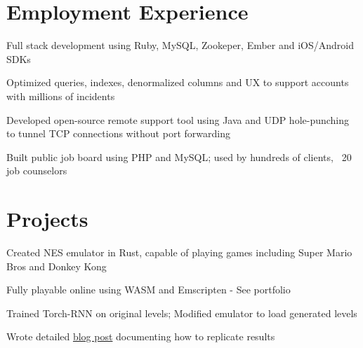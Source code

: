 \documentclass[]{deedy-resume-openfont}
\begin{document}
\begin{minipage}[t]{0.67\textwidth}

\section{Employment Experience}
\vspace{\topsep} %
\begin{tightemize}
	\item Full stack development using Ruby, MySQL, Zookeper, Ember and iOS/Android SDKs
	\item Optimized queries, indexes, denormalized columns and UX to support accounts with millions of incidents
\end{tightemize}
\sectionsep

\begin{tightemize}
	\item Developed open-source remote support tool using Java and UDP hole-punching to tunnel TCP connections without port forwarding
	\item Built public job board using PHP and MySQL; used by hundreds of clients, ~20 job counselors
\end{tightemize}
\sectionsep

\section{Projects}

\begin{tightemize}
	\item Created NES emulator in Rust, capable of playing games including Super Mario Bros and Donkey Kong
	\item Fully playable online using WASM and Emscripten - See portfolio
\end{tightemize}
\sectionsep

\begin{tightemize}
	\item Trained Torch-RNN on original levels; Modified emulator to load generated levels
	\item Wrote detailed  \href{https://medium.com/@justin_michaud/super-mario-bros-level-generation-using-torch-rnn-726ddea7e9b7}{blog post} documenting how to replicate results
\end{tightemize}
\sectionsep


\end{minipage}
\end{document}
